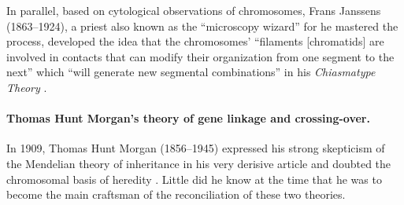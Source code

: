 In parallel, based on cytological observations of chromosomes, Frans Janssens (1863--1924), a priest also known as the “microscopy wizard” for he mastered the process, developed the idea that the chromosomes' “filaments [chromatids] are involved in contacts that can modify their organization from one segment to the next” which “will generate new segmental combinations” in his \textit{Chiasmatype Theory} \citep{janssens1909theorie}.



\paragraph{Thomas Hunt Morgan's theory of gene linkage and crossing-over.}
% 
In 1909, Thomas Hunt Morgan (1856--1945) expressed his strong skepticism of the Mendelian theory of inheritance in his very derisive article \textit{} \citep{morgan1909factors} and doubted the chromosomal basis of heredity \citep[reviewed in][]{koszul2012centenary}.
Little did he know at the time that he was to become the main craftsman of the reconciliation of these two theories.




